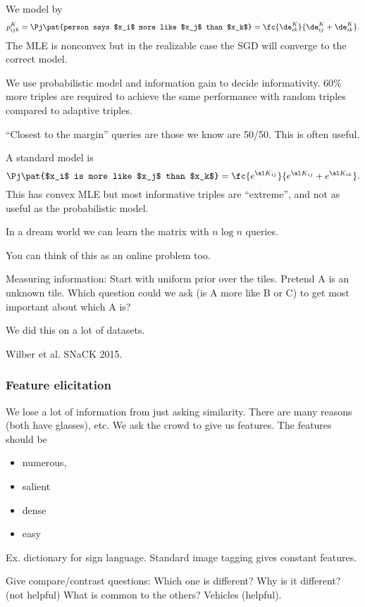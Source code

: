 We model by 
$$
p_{ijk}^K=\Pj\pat{person says $x_i$ more like $x_j$ than $x_k$} = \fc{\de_{ik}^K}{\de_{ij}^K + \de_{ik}^K}.
$$
The MLE is nonconvex but in the realizable case the 
SGD will converge to the correct model.

We use probabilistic model and information gain to decide informativity. 60\% more triples are required to achieve the same performance with random triples compared to adaptive triples.

``Closest to the margin'' queries are those we know are 50/50. This is often useful.

A standard model is
$$
\Pj\pat{$x_i$ is more like $x_j$ than $x_k$} = \fc{e^{\al K_{ij}}}{e^{\al K_{ij}} + e^{\al K_{ik}}}.
$$
This has convex MLE but most informative triples are ``extreme'', and not as useful as the probabilistic model.

In a dream world we can learn the matrix with $n\log n$ queries.

You can think of this as an online problem too.

Measuring information: Start with uniform prior over the tiles. Pretend A is an unknown tile. Which question could we ask (is A more like B or C) to get most important about which A is?

We did this on a lot of datasets.

Wilber et al. SNaCK 2015. 

\subsubsection{Feature elicitation}

We lose a lot of information from just asking similarity. There are many reasons (both have glasses), etc. We ask the crowd to give us features.
The features should be
\begin{itemize}
\item
numerous,
\item
salient
\item
dense
\item
easy
\end{itemize}
Ex. dictionary for sign language. Standard image tagging gives constant features.

Give compare/contrast questions: Which one is different? Why is it different? (not helpful) What is common to the others? Vehicles (helpful).

